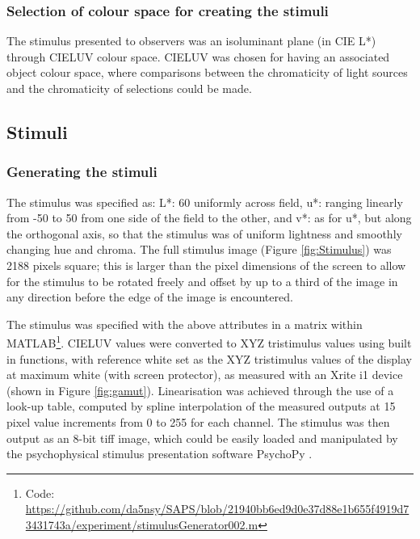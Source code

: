 \subsubsection{Selection of colour space for creating the stimuli}

The stimulus presented to observers was an isoluminant plane (in CIE L*) through CIELUV colour space. CIELUV was chosen for having an associated object colour space, where comparisons between the chromaticity of light sources and the chromaticity of selections could be made. 

\subsection{Stimuli} \label{sec:stimuli}
\subsubsection{Generating the stimuli}

The stimulus was specified as: L*: 60 uniformly across field, u*: ranging linearly from -50 to 50 from one side of the field to the other, and v*: as for u*, but along the orthogonal axis, so that the stimulus was of uniform lightness and smoothly changing hue and chroma. The full stimulus image (Figure \ref{fig:Stimulus}) was 2188 pixels square; this is larger than the pixel dimensions of the screen to allow for the stimulus to be rotated freely and offset by up to a third of the image in any direction before the edge of the image is encountered. 

The stimulus was specified with the above attributes in a matrix within \gls{MATLAB}\footnote{Code: \url{https://github.com/da5nsy/SAPS/blob/21940bb6ed9d0e37d88e1b655f4919d73431743a/experiment/stimulusGenerator002.m}}. CIELUV values were converted to XYZ tristimulus values using built in functions, with reference white set as the XYZ tristimulus values of the display at maximum white (with screen protector), as measured with an Xrite i1 device (shown in Figure \ref{fig:gamut}). Linearisation was achieved through the use of a look-up table, computed by spline interpolation of the measured outputs at 15 pixel %
value increments from 0 to 255 for each channel. The stimulus was then output as an 8-bit tiff image, which could be easily loaded and manipulated by the psychophysical stimulus presentation software PsychoPy \citep{peirce_psychopypsychophysics_2007}. %

